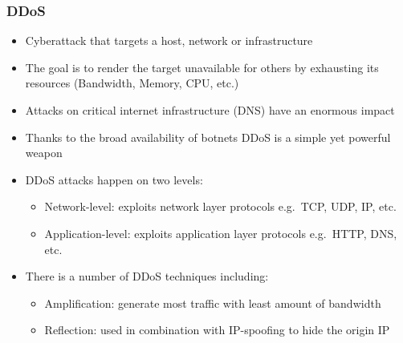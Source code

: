 \documentclass[10pt, presentation]{beamer}
\begin{document}
    \begin{frame}
        \frametitle{DDoS}
        \begin{itemize}
            \item Cyberattack that targets a host, network or infrastructure \cite{article:8}
            \item The goal is to render the target unavailable for others by exhausting its resources (Bandwidth, Memory, CPU, etc.)
            \item Attacks on critical internet infrastructure (DNS) have an enormous impact
            \item Thanks to the broad availability of botnets DDoS is a simple yet powerful weapon
            \item DDoS attacks happen on two levels:
            \begin{itemize}
                \item Network-level: exploits network layer protocols e.g.\ TCP, UDP, IP, etc.
                \item Application-level: exploits application layer protocols e.g.\ HTTP, DNS, etc.
            \end{itemize}
            \item There is a number of DDoS techniques including:
            \begin{itemize}
                \item Amplification: generate most traffic with least amount of bandwidth
                \item Reflection: used in combination with IP-spoofing to hide the origin IP
            \end{itemize}
        \end{itemize}
    \end{frame}

\end{document}
